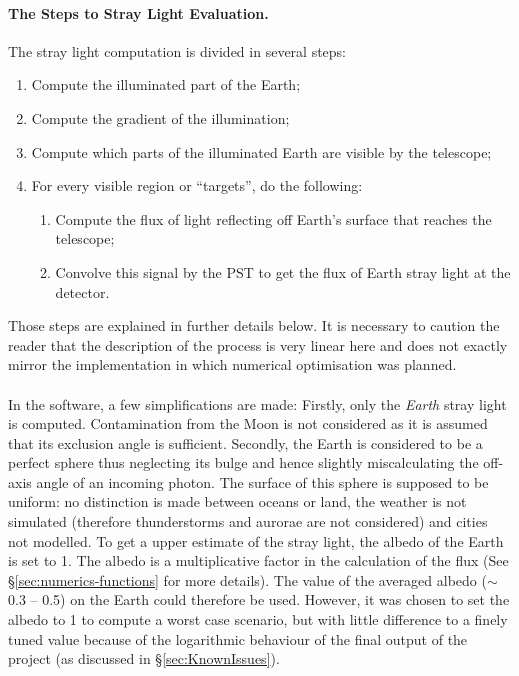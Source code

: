 \documentclass[a4paper,10pt]{article}
\begin{document}
\paragraph{The Steps to Stray Light Evaluation.}
The stray light computation is divided in several steps:
\begin{enumerate}
 \item Compute the illuminated part of the Earth;
 \item Compute the gradient of the illumination;
 \item Compute which parts of the illuminated Earth are visible by the telescope;
 \item For every visible region or ``targets'', do the following:
 \begin{enumerate}
  \item Compute the flux of light reflecting off Earth's surface that reaches the telescope;
 \item Convolve this signal by the PST to get the flux of Earth stray light at the detector.
 \end{enumerate}
\end{enumerate}
Those steps are explained in further details below. It is necessary to caution the reader that the description of the process is very linear here and does not exactly mirror the implementation in which numerical optimisation was planned. 
\paragraph{}
In the software, a few simplifications are made: Firstly, only the \emph{Earth} stray light is computed. Contamination from the Moon is not considered as it is assumed that its exclusion angle is sufficient. Secondly, the Earth is considered to be a perfect sphere thus neglecting its bulge and hence slightly miscalculating the off-axis angle of an incoming photon. 
The surface of this sphere is supposed to be uniform: no distinction is made between oceans or land, the weather is not simulated (therefore thunderstorms and aurorae are not considered) and cities not modelled. To get a upper estimate of the stray light, the albedo of the Earth is set to 1. The albedo is a multiplicative factor in the calculation of the flux (See \S\ref{sec:numerics-functions} for more details). The value of the averaged albedo ($\sim$ 0.3 -- 0.5) on the Earth could therefore be used. 
However, it was chosen to set the albedo to 1 to compute a worst case scenario, but with little difference to a finely tuned value because of the logarithmic behaviour of the final output of the project (as discussed in \S\ref{sec:KnownIssues}).
\end{document}
